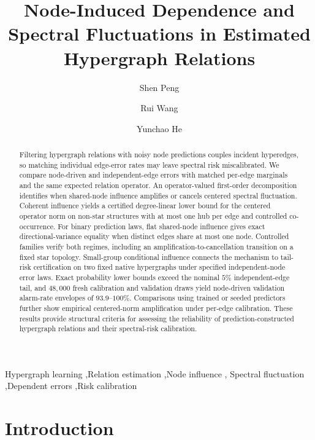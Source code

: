 \documentclass[preprint,11pt]{elsarticle}
\begin{document}
\begin{frontmatter}
\title{Node-Induced Dependence and Spectral Fluctuations
in Estimated Hypergraph Relations}
\author[a]{Shen Peng}
\author[a]{Rui Wang}
\author[a]{Yunchao He}
\address[a]{Academy of Artificial Intelligence and Advanced Technology,
Xi'an Jiaotong-Liverpool University, Suzhou 215412, China}

\begin{abstract}
Filtering hypergraph relations with noisy node predictions couples
incident hyperedges, so matching individual edge-error rates may leave
spectral risk miscalibrated. We compare node-driven and independent-edge
errors with matched per-edge marginals and the same expected relation
operator. An operator-valued first-order decomposition identifies when
shared-node influence amplifies or cancels centered spectral fluctuation.
Coherent influence yields a certified degree-linear lower bound for the
centered operator norm on non-star structures with at most one hub per
edge and controlled co-occurrence. For binary prediction laws, flat
shared-node influence gives exact directional-variance equality when
distinct edges share at most one node. Controlled families verify both
regimes, including an amplification-to-cancellation transition on a fixed
star topology. Small-group conditional influence connects the mechanism
to tail-risk certification on two fixed native hypergraphs under specified
independent-node error laws. Exact probability lower bounds exceed the
nominal $5\%$ independent-edge tail, and $48{,}000$ fresh calibration and
validation draws yield node-driven validation alarm-rate envelopes of
$93.9$--$100\%$. Comparisons using trained or seeded predictors further
show empirical centered-norm amplification under per-edge calibration.
These results provide structural criteria for assessing the reliability
of prediction-constructed hypergraph relations and their spectral-risk
calibration.
\end{abstract}
\begin{keyword}
Hypergraph learning \sep Relation estimation \sep Node influence \sep
Spectral fluctuation \sep Dependent errors \sep Risk calibration
\end{keyword}
\end{frontmatter}

\section{Introduction}\label{sec:intro}
\end{document}
